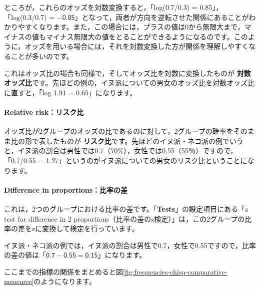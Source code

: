 \documentclass[
  12pt,
  a5jpaper,
  lualatex, ja=standard]{bxjsbook}
\renewcommand{\emph}[1]{\textbf{\color{emph} #1}}
\begin{document}
ところが，これらのオッズを対数変換すると，「log(0.7/0.3) = 0.85」，「log(0.3/0.7) = \(-\textsf{0.85}\)」となって，両者が方向を逆転させた関係にあることがわかりやすくなります。また，この場合には，プラスの値は0から無限大まで，マイナスの値もマイナス無限大の値をとることができるようになるのです。このように，オッズを用いる場合には，それを対数変換した方が関係を理解しやすくなることが多いのです。

これはオッズ比の場合も同様で，そしてオッズ比を対数に変換したものが\emph{対数オッズ比}です。先ほどの例の，イヌ派についての男女のオッズ比を対数オッズ比に直すと，「log 1.91 = 0.65」になります。

\hypertarget{relative-riskux30eaux30b9ux30afux6bd4}{%
\paragraph*{Relative risk：リスク比}\label{relative-riskux30eaux30b9ux30afux6bd4}}

オッズ比が2グループのオッズの比であるのに対して，2グループの確率をそのまま比の形で表したものが\emph{リスク比}です。先ほどのイヌ派・ネコ派の例でいうと，イヌ派の割合は男性では0.7（70\%），女性では0.55（55％）ですので，「0.7/0.55 = 1.27」というのがイヌ派についての男女のリスク比ということになります。

\hypertarget{difference-in-proportionsux6bd4ux7387ux306eux5dee}{%
\paragraph*{Difference in proportions：比率の差}\label{difference-in-proportionsux6bd4ux7387ux306eux5dee}}

これは，2つのグループにおける比率の差です。「\textbf{Tests}」の設定項目にある「z test for difference in 2 proportions（比率の差のz検定）」は，この2グループの比率の差をzに変換して検定を行っています。

イヌ派・ネコ派の例では，イヌ派の割合は男性で0.7，女性で0.55ですので，比率の差の値は「\(\textsf{0.7}-\textsf{0.55} = \textsf{0.15}\)」になります。

ここまでの指標の関係をまとめると図\ref{fig:frequencies-chisq-comparative-measures}のようになります。
\end{document}
